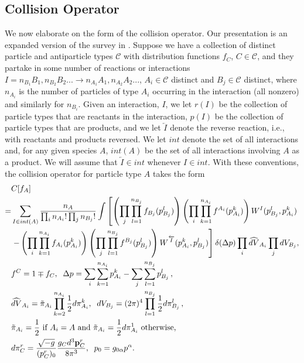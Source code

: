 \subsection{Collision Operator}
We now elaborate on the form of the collision operator.  Our presentation is an expanded version of the survey in \cite{ehlers}.  Suppose we have a collection of  distinct particle and antiparticle types $\mathcal{C}$ with distribution functions $f_{C}$, $C\in\mathcal{C}$, and they partake in some number of reactions or interactions $I=n_{B_1} B_1, n_{B_2}B_2...\longrightarrow n_{A_1} A_1,n_{A_2}A_2...$, $A_i\in\mathcal{C}$ distinct and $B_j\in\mathcal{C}$ distinct, where $n_{A_i}$ is the number of particles of type $A_i$ occurring in the interaction (all nonzero) and similarly for $n_{B_i}$.  Given an interaction, $I$, we let $r(I)$ be the collection of particle types that are reactants in the interaction, $p(I)$ be the collection of particle types that are products, and we let $\overleftarrow{I}$ denote the reverse reaction, i.e., with reactants and products reversed.   We let $int$ denote the set of all interactions and, for any given species $A$, $int(A)$ be the set of all interactions involving $A$ as a   product.   We will assume that $\overleftarrow{I}\in int$ whenever $I\in int$.  With these conventions, the collision operator for particle type $A$ takes the form
\begin{align}\label{collision_operator}
&C[f_A]\\
=&\sum_{I\in int(A)} \frac{n_A}{\prod_i n_{A_i}!\prod _j n_{B_j}!}\int\left[\left(\prod_j \prod_{l=1}^{n_{B_j}}f_{B_j}(p_{B_j}^l)\right)\left(\prod_i \prod_{k=1}^{n_{A_i}}f^{A_i}(p_{A_i}^k)\right)W^I(p_{B_j}^l,p_{A_i}^k) \right.\notag\\
& \left. -\left(\prod_i \prod_{k=1}^{n_{A_i}}f_{A_i}(p_{A_i}^k)\right)\left(\prod_j \prod_{l=1}^{n_{B_j}}f^{B_j}(p_{B_j}^l)\right)W^{\overleftarrow{I}}(p_{A_i}^k,p_{B_j}^l) \right] \delta(\Delta p)\prod_i \widehat{dV}_{A_i}\prod_j dV_{B_j},\notag\\
&f^C=1\mp f_C, \hspace{2mm} \Delta p=\sum_i \sum_{k=1}^{n_{A_i}}p^k_{A_i}-\sum_j \sum_{l=1}^{n_{B_j}}p^l_{B_j}\,,\notag\\
&\widehat{dV}_{A_i}=\tilde{\pi}_{A_i}\prod_{k=2}^{n_{A_i}}\frac{1}{2}d\pi^k_{A_i}, \hspace{2mm}  dV_{B_j}=(2\pi)^4\prod_{l=1}^{n_{B_j}}\frac{1}{2}d\pi^l_{B_j}\,,\notag\\
&\tilde{\pi}_{A_i}=\frac{1}{2} \text{ if } A_i=A \text{ and }  \tilde{\pi}_{A_i}=\frac{1}{2}d\pi^1_{A_i} \text{ otherwise,} \notag\\
&d\pi_{C}^r=\frac{\sqrt{-g}}{(p_{C}^r)_0}\frac{g_{C}d^3{\bf p}_{C}^r}{8\pi^3}, \hspace{2mm}p_0=g_{0\alpha}p^\alpha.\notag
\end{align}
